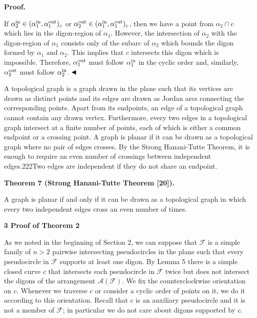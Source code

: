 \documentclass[10pt,a4paper]{amsart}
\providecommand{\cal}{\mathcal}
\begin{document}
\par
\par
\par
\par
\par\medskip\noindent\textbf{Proof.}\par
If $\alpha_{2}^{\rm in}\in(\alpha_{1}^{\rm in},\alpha_{1}^{\rm out})_{c}$ or $\alpha_{2}^{\rm out}\in(\alpha_{1}^{\rm in},\alpha_{1}^{\rm out})_{c}$, then we have a point from $\alpha_{2}\cap c$ which lies in the digon-region of $\alpha_{1}$. However, the intersection of $\alpha_{2}$ with the digon-region of $\alpha_{1}$ consists only of the subarc of $\alpha_{2}$ which bounds the digon formed by $\alpha_{1}$ and $\alpha_{2}$. This implies that $c$ intersects this digon which is impossible. Therefore, $\alpha_{1}^{\rm out}$ must follow $\alpha_{1}^{\rm in}$ in the cyclic order and, similarly, $\alpha_{2}^{\rm out}$ must follow $\alpha_{2}^{\rm in}$. $\hfill\blacktriangleleft$
\par
\par
A topological graph is a graph drawn in the plane such that its vertices are drawn as distinct points and its edges are drawn as Jordan arcs connecting the corresponding points. Apart from its endpoints, an edge of a topological graph cannot contain any drawn vertex. Furthermore, every two edges in a topological graph intersect at a finite number of points, each of which is either a common endpoint or a crossing point. A graph is planar if it can be drawn as a topological graph where no pair of edges crosses. By the Strong Hanani-Tutte Theorem, it is enough to require an even number of crossings between independent edges.222Two edges are independent if they do not share an endpoint.
\par
\par
\par\medskip\noindent\textbf{Theorem 7 (Strong Hanani-Tutte Theorem [20]).}\par
A graph is planar if and only if it can be drawn as a topological graph in which every two independent edges cross an even number of times.
\par
\par
\par
\par
\par\medskip\noindent\textbf{3 Proof of Theorem 2}\par
As we noted in the beginning of Section 2, we can suppose that ${\cal{F}}$ is a simple family of $n>2$ pairwise intersecting pseudocircles in the plane such that every pseudocircle in ${\cal{F}}$ supports at least one digon. By Lemma 5 there is a simple closed curve $c$ that intersects each pseudocircle in ${\cal{F}}$ twice but does not intersect the digons of the arrangement ${\cal{A}}({\cal{F}})$. We fix the counterclockwise orientation on $c$. Whenever we traverse $c$ or consider a cyclic order of points on it, we do it according to this orientation. Recall that $c$ is an auxiliary pseudocircle and it is not a member of ${\cal{F}}$; in particular we do not care about digons supported by $c$.
\end{document}
